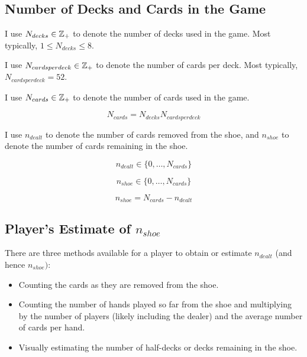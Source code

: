\subsection{Number of Decks and Cards in the Game}
\label{cmct0:sctp0:nga0}

I use $N_{decks} \in {\mathbb{Z}_+}$ to denote the number of decks used in the game.
Most typically, $1 \leq N_{decks} \leq 8$.

I use $N_{cardsperdeck} \in {\mathbb{Z}_+}$ to denote the number of cards per deck.
Most typically, $N_{cardsperdeck} = 52$.

I use $N_{cards} \in {\mathbb{Z}_+}$ to denote the number of cards used in the game.

\begin{equation}
\label{eq:cmct0:sctp0:nga0:01}
N_{cards} =  N_{decks} N_{cardsperdeck}
\end{equation}

I use $n_{dealt}$ to denote the number of cards removed from the shoe, and $n_{shoe}$ to
denote the number of cards remaining in the shoe.

\begin{equation}
\label{eq:cmct0:sctp0:nga0:02}
n_{dealt} \in \{ 0, \ldots , N_{cards} \}
\end{equation}

\begin{equation}
\label{eq:cmct0:sctp0:nga0:02}
n_{shoe} \in \{ 0, \ldots , N_{cards} \}
\end{equation}

\begin{equation}
\label{eq:cmct0:sctp0:nga0:03}
n_{shoe} = N_{cards} - n_{dealt}
\end{equation}


\subsection{Player's Estimate of $n_{shoe}$}
\label{cmct0:sctp0:npes0}

There are three methods available for a player to obtain or estimate 
$n_{dealt}$ (and hence $n_{shoe})$:

\begin{itemize}
\item Counting the cards as they are removed
      from the shoe.
\item Counting the number of hands played so far from the shoe and multiplying by 
      the number of players (likely including the dealer) and the average number
      of cards per hand.
\item Visually estimating the number of half-decks or decks remaining in the shoe.
\end{itemize}

